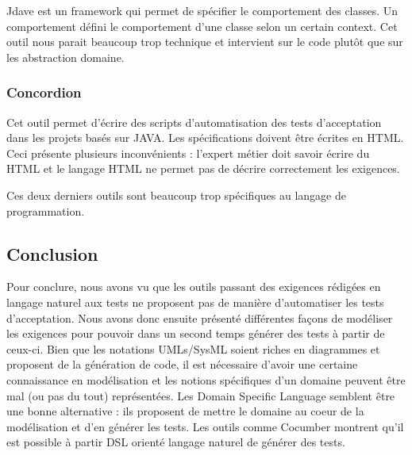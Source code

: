        Jdave est un framework qui permet de spécifier le comportement des classes. Un comportement défini le comportement d'une classe selon un certain context. Cet outil nous parait beaucoup trop technique et intervient sur le code plutôt que sur les abstraction domaine. 
        
        \subsubsection{Concordion}
        Cet outil permet d'écrire des scripts d'automatisation des tests d'acceptation dans les projets basés sur JAVA. Les spécifications doivent être écrites en HTML. Ceci présente plusieurs inconvénients : l'expert métier doit savoir écrire du HTML et le langage HTML ne permet pas de décrire correctement les exigences.
        
        Ces deux derniers outils sont beaucoup trop spécifiques au langage de programmation.


\subsection{Conclusion}
Pour conclure, nous avons vu que les outils passant des exigences rédigées en langage naturel aux tests ne proposent pas de manière d'automatiser les tests d'acceptation. Nous avons donc ensuite présenté différentes façons de modéliser les exigences pour pouvoir dans un second temps générer des tests à partir de ceux-ci. Bien que les notations UMLs/SysML soient riches en diagrammes et proposent de la génération de code, il est nécessaire d'avoir une certaine connaissance en modélisation et les notions spécifiques d'un domaine peuvent être mal (ou pas du tout) représentées. Les Domain Specific Language semblent être une bonne alternative : ils proposent de mettre le domaine au coeur de la modélisation et d'en générer les tests. Les outils comme Cocumber montrent qu'il est possible à partir DSL orienté langage naturel de générer des tests. 

